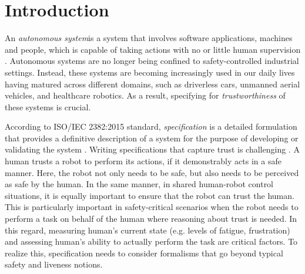 \documentclass[sigconf]{acmart}
\begin{document}



\maketitle

\section{Introduction}
An \textit{autonomous system}is a system that involves software applications, machines and people, which is capable of taking actions with no or little human supervision \cite{TAS-Hub}. 
Autonomous systems are no longer being confined to safety-controlled industrial settings. 
Instead, these systems are becoming increasingly used in our daily lives having matured across different domains, such as driverless cars, unmanned aerial vehicles, and healthcare robotics. 
As a result, specifying for \textit{trustworthiness} of these systems is crucial. 

According to ISO/IEC 2382:2015 standard, \textit{specification} is a detailed formulation that provides a definitive description of a system for the purpose of developing or validating the system \cite{ISO2382}. 
Writing specifications that capture trust is challenging \cite{Kress-Gazit2021}. 
A human trusts a robot to perform its actions, if it demonstrably acts in a safe manner. 
Here, the robot not only needs to be safe, but also needs to be perceived as safe by the human. 
In the same manner, in shared human-robot control situations, it is equally important to ensure that the robot can trust the human. 
This is particularly important in safety-critical scenarios when the robot needs to perform a task on behalf of the human where reasoning about trust is needed. 
In this regard, measuring human's current state (e.g. levels of fatigue, frustration) and assessing human's ability to actually perform the task are critical factors. 
To realize this, specification needs to consider formalisms that go beyond typical safety and liveness notions. 
\end{document}
